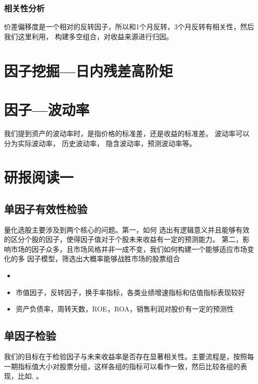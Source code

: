 \documentclass[12pt]{article}
\theoremstyle{definition}
\begin{document}
\subsubsection{相关性分析}
价差偏移度是一个相对的反转因子，所以和1个月反转，3个月反转有相关性，然后我们这里利用，
构建多空组合，对收益来源进行归因。


\section{因子挖掘—日内残差高阶矩}


\section{因子—波动率}
我们提到资产的波动率时，是指价格的标准差，还是收益的标准差。
波动率可以分为实际波动率， 历史波动率， 隐含波动率，预测波动率等。





\section{研报阅读一}
\cite{ori1}
\subsection{单因子有效性检验}
量化选股主要涉及到两个核心的问题。第一，如何 选出有逻辑意义并且能够有效的区分个股的因子，使得因子值对于个股未来收益有一定的预测能力。 第二，影响市场的因子众多，且市场风格并非一成不变，我们如何构建一个能够适应市场变化的多 因子模型，筛选出大概率能够战胜市场的股票组合
\begin{sconclude}{}{}
\begin{itemize}
	\item 
	\item 市值因子，反转因子，换手率指标，各类业绩增速指标和估值指标表现较好
	\item 资产负债率，周转天数，ROE，ROA，销售利润对股价有一定的预测性
\end{itemize}
\end{sconclude}


\subsection{单因子检验}
我们的目标在于检验因子与未来收益率是否存在显著相关性。主要流程是，按照每一期指标值大小对股票分组，这样各组的指标可以看作一致，然后比较各组的表现，比如, 。
\end{document}
